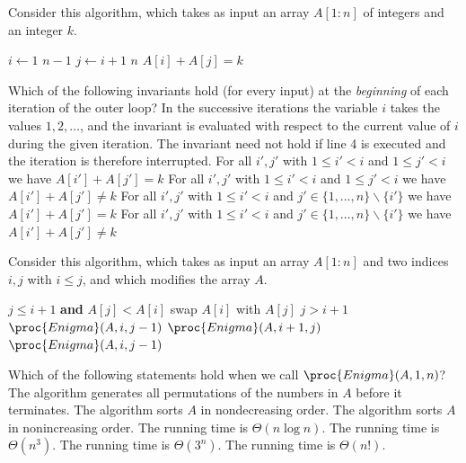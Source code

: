 Consider this algorithm, which takes as input an array $A[1:n]$ of integers and an integer $k$.
\begin{codebox}
\li \For $i \gets 1$ \To $n-1$
\li \Do
        \For $j \gets i+1$ \To $n$
\li     \Do
            \If $A[i] + A[j] = k$
\li         \Then \Return {}
         \End
        \End
    \End
\li \Return {}
\end{codebox}
Which of the following invariants hold (for every input) at the \emph{beginning} of each iteration of the outer loop?
In the successive iterations the variable $i$ takes the values $1, 2, \dots$, and the invariant is evaluated with respect to the current value of $i$ during the given iteration.
The invariant need not hold if line 4 is executed and the iteration is therefore interrupted.
\multipleanswers
\optionsstart
\answer For all $i',j'$ with $1\leq i' < i$ and $1\leq j'<i$ we have $A[i']+A[j'] = k$
\answer For all $i',j'$ with $1\leq i' < i$ and $1\leq j'<i$ we have $A[i']+A[j'] \ne k$
\answer For all $i',j'$ with $1\leq i' < i$ and $j'\in\{1,\dots,n\}\backslash\{i'\}$ we have $A[i']+A[j'] = k$
\answer For all $i',j'$ with $1\leq i' < i$ and $j'\in\{1,\dots,n\}\backslash\{i'\}$ we have $A[i']+A[j'] \ne k$ \correct
\optionsend
{}

Consider this algorithm, which takes as input an array $A[1:n]$ and two indices $i,j$ with $i\leq j$, and which modifies the array $A$.
\begin{codebox}
  \li \If $j\leq i+1$ \textbf{ and } $A[j]<A[i]$ \Do
  \li swap $A[i]$ with $A[j]$  \li \ElseIf $j>i+1$ \Do
  \li $\proc{Enigma}(A,i,j-1)$
  \li $\proc{Enigma}(A,i+1,j)$
  \li $\proc{Enigma}(A,i,j-1)$
  \End
\end{codebox}
Which of the following statements hold when we call $\proc{Enigma}(A, 1, n)$?
\multipleanswers
\optionsstart
\answer The algorithm generates all permutations of the numbers in $A$ before it terminates.
\answer The algorithm sorts $A$ in nondecreasing order.\correct
\answer The algorithm sorts $A$ in nonincreasing order.
\answer The running time is $\Theta(n \log n)$.
\answer The running time is $\Theta(n^3)$.
\answer The running time is $\Theta(3^n)$.\correct
\answer The running time is $\Theta(n!)$.
\optionsend
{}

